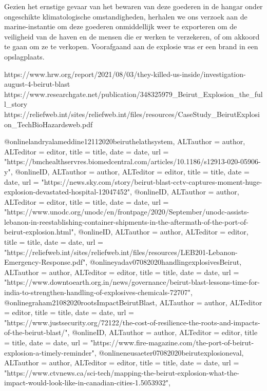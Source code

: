 {{{{{{{{{Gezien het ernstige gevaar van het bewaren van deze goederen in de hangar onder ongeschikte klimatologische omstandigheden, herhalen we ons verzoek aan de marine-instantie om deze goederen onmiddellijk weer te exporteren om de veiligheid van de haven en de mensen die er werken te verzekeren, of om akkoord te gaan om ze te verkopen.
Voorafgaand aan de explosie was er een brand in een opslagplaats. 

https://www.hrw.org/report/2021/08/03/they-killed-us-inside/investigation-august-4-beirut-blast 
\cite{hrw03082021investigateBeirutBlast}
https://www.researchgate.net/publication/348325979_Beirut_Explosion_the_full_story 
\cite{souaibyElHussein112020Beirutstory}
https://reliefweb.int/sites/reliefweb.int/files/resources/CaseStudy_BeirutExplosion_TechBioHazardsweb.pdf 
\cite{ifrc2020chemicalexplosionBeirutPort}

@online{landryalameddine12112020beiruthelathsystem,	ALTauthor = {author},	ALTeditor = {editor},	title = {title},	date = {date},	url = {"https://bmchealthservres.biomedcentral.com/articles/10.1186/s12913-020-05906-y"},}
@online{ID,	ALTauthor = {author},	ALTeditor = {editor},	title = {title},	date = {date},	url = {"https://news.sky.com/story/beirut-blast-cctv-captures-moment-huge-explosion-devastated-hospital-12047452"},}
@online{ID,	ALTauthor = {author},	ALTeditor = {editor},	title = {title},	date = {date},	url = {"https://www.unodc.org/unodc/en/frontpage/2020/September/unodc-assists-lebanon-in-reestablishing-container-shipments-in-the-aftermath-of-the-port-of-beirut-explosion.html"},}
@online{ID,	ALTauthor = {author},	ALTeditor = {editor},	title = {title},	date = {date},	url = {"https://reliefweb.int/sites/reliefweb.int/files/resources/LEB201-Lebanon-Emergency-Response.pdf"},}
@online{yadav07082020handlingexplosivesBeirut,	ALTauthor = {author},	ALTeditor = {editor},	title = {title},	date = {date},	url = {"https://www.downtoearth.org.in/news/governance/beirut-blast-lessons-time-for-india-to-strengthen-handling-of-explosives-chemicals-72707"},}
@online{graham21082020rootsImpactBeirutBlast,	ALTauthor = {author},	ALTeditor = {editor},	title = {title},	date = {date},	url = {"https://www.justsecurity.org/72122/the-cost-of-resilience-the-roots-and-impacts-of-the-beirut-blast/"},}
@online{ID,	ALTauthor = {author},	ALTeditor = {editor},	title = {title},	date = {date},	url = {"https://www.fire-magazine.com/the-port-of-beirut-explosion-a-timely-reminder"},}
@online{neusaeter07082020beirutexplosioneval,	ALTauthor = {author},	ALTeditor = {editor},	title = {title},	date = {date},	url = {"https://www.ctvnews.ca/sci-tech/mapping-the-beirut-explosion-what-the-impact-would-look-like-in-canadian-cities-1.5053932"},}


}}}}}}}}}
